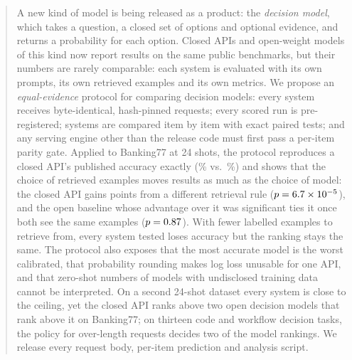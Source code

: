 \begin{abstract}
A new kind of model is being released as a product: the \emph{decision model}, which takes a question, a closed
set of options and optional evidence, and returns a probability for each option. Closed APIs and open-weight models
of this kind now report results on the same public benchmarks, but their numbers are rarely comparable: each
system is evaluated with its own prompts, its own retrieved examples and its own metrics. We propose an
\emph{equal-evidence} protocol for comparing decision models: every system receives byte-identical, hash-pinned
requests; every scored run is pre-registered; systems are compared item by item with exact paired tests; and any
serving engine other than the release code must first pass a per-item parity gate. Applied to Banking77 at 24
shots, the protocol reproduces a closed API's published accuracy exactly (\fsJevAAcc\% vs.\ \fsJevPubAcc\%) and
shows that the choice of retrieved examples moves results as much as the choice of model: the closed API gains
\fsJevBMinusJevAPt{} points from a different retrieval rule ($p=\fsJevBVsJevAP$), and the open baseline whose
advantage over it was significant ties it once both see the same examples ($p=\fsCleanVsJevBP$). With fewer
labelled examples to retrieve from, every system tested loses accuracy but the ranking stays the same. The protocol also
exposes that the most accurate model is the worst calibrated, that probability rounding makes log loss unusable for
one API, and that zero-shot numbers of models with undisclosed training data cannot be interpreted.
On a second 24-shot dataset every system is close to the ceiling, yet the closed API ranks above two open decision
models that rank above it on Banking77; on thirteen code and workflow decision tasks, the policy for over-length
requests decides two of the model rankings.
We release every request body, per-item prediction and analysis script.
\end{abstract}
